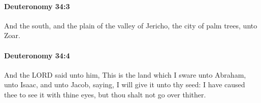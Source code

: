 		\paragraph{Deuteronomy 34:3} %
			\label{DEUTERONOMY-34-3}

			And the south, and the plain of the valley of Jericho, the city of palm trees, unto Zoar.


		\paragraph{Deuteronomy 34:4} %
			\label{DEUTERONOMY-34-4}

			And the LORD said unto him, This is the land which I sware unto Abraham, unto Isaac, and unto Jacob, saying, I will give it unto thy seed: I have caused thee to see it with thine eyes, but thou shalt not go over thither.


